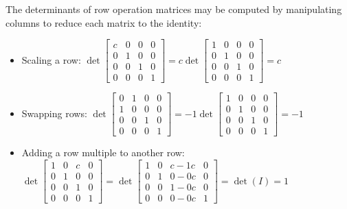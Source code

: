 \begin{fact}
The determinants of row operation matrices may be computed
by manipulating columns to reduce each matrix to the identity:
\begin{itemize}
\item Scaling a row: \(\det
  \begin{bmatrix}
  c & 0 & 0 & 0\\
  0 & 1 & 0 & 0 \\
  0 & 0 & 1 & 0 \\
  0 & 0 & 0 & 1
  \end{bmatrix}
    =
  c\det
  \begin{bmatrix}
  1 & 0 & 0 & 0\\
  0 & 1 & 0 & 0  \\
  0 & 0 & 1 & 0 \\
  0 & 0 & 0 & 1
  \end{bmatrix}
    =
  c
\)
\item Swapping rows: \(\det
  \begin{bmatrix}
  0 & 1 & 0 & 0 \\
  1 & 0 & 0 & 0 \\
  0 & 0 & 1 & 0 \\
  0 & 0 & 0 & 1
  \end{bmatrix}
    =
  -1\det
  \begin{bmatrix}
  1 & 0 & 0 & 0\\
  0 & 1 & 0 & 0\\
  0 & 0 & 1 & 0 \\
  0 & 0 & 0 & 1
  \end{bmatrix}
    =
  -1
\)
\item Adding a row multiple to another row: \(\det
  \begin{bmatrix}
  1 & 0 & c & 0\\
  0 & 1 & 0 & 0\\
  0 & 0 & 1 & 0 \\
  0 & 0 & 0 & 1
  \end{bmatrix}
    =
  \det
  \begin{bmatrix}
  1 & 0 & c-1c & 0\\
  0 & 1 & 0-0c & 0\\
  0 & 0 & 1-0c & 0 \\
  0 & 0 & 0-0c & 1
  \end{bmatrix}
    =
  \det(I)=1
\)
\end{itemize}
\end{fact}

